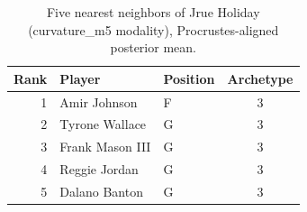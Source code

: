 \begin{table}[htbp]
  \centering\small
  \begin{tabular}{rllc}
    \toprule
    Rank & Player & Position & Archetype \\
    \midrule
    1 & Amir Johnson & F & 3 \\
    2 & Tyrone Wallace & G & 3 \\
    3 & Frank Mason III & G & 3 \\
    4 & Reggie Jordan & G & 3 \\
    5 & Dalano Banton & G & 3 \\
    \bottomrule
  \end{tabular}
  \caption{Five nearest neighbors of Jrue Holiday (curvature_m5 modality), Procrustes-aligned posterior mean.}
  \label{tab:Jrue_Holiday_neighbors_curvature_m5}
\end{table}

